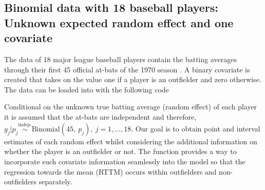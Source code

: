 \documentclass[article]{jss}
\begin{document}
\subsection[Unknown Second-level Mean and One Covariate]{Binomial data with 18 baseball players:  Unknown expected random effect and one covariate} 

The data of 18 major league baseball players contain the batting averages
through their first 45 official at-bats of the 1970 season \citep{1975}. A
binary covariate is created that takes on the value one if a player is an
outfielder and zero otherwise. The data can be loaded into  with the following code
\begin{CodeChunk}
\end{CodeChunk}
Conditional on the unknown true batting average (random effect) of each player
it is assumed that the at-bats are independent and therefore, $y_{j}\vert p_{j} \textrm{Binomial}(45,~ p_{j}), ~j=1, \ldots, 18$. Our goal is to obtain point and interval estimates of each random effect whilst considering the additional information on whether the player is an outfielder or not. The function  provides a way to incorporate such covariate information seamlessly into the model so that the regression towards the mean (RTTM) occurs within outfielders and non-outfielders separately. %
\end{document}
